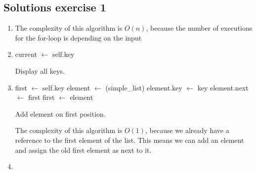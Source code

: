 \documentclass{article}
\begin{document}
\subsection*{Solutions exercise 1}
\begin{enumerate}
    \item The complexity of this algorithm is $O(n)$, because the number of executions for the for-loop is depending on the input
    \item
    \begin{algorithm}


     current $\leftarrow$ self.key \;


     \caption{Display all keys.}
\end{algorithm}
\vspace{-0.5cm}
    \item
    \begin{algorithm}


    first $\leftarrow$ self.key \;
    element $\leftarrow$ \New(simple\_list) \;
    element.key $\leftarrow$ key \;
    element.next $\leftarrow$ first \;
    first $\leftarrow$ element \;


     \caption{Add element on first position.}
\end{algorithm}
\vspace{-0.5cm}
    The complexity of this algorithm is $O(1)$, because we already have a reference to the first element of the list. This means we can add an element and assign the old first element as next to it.
    \item
    \begin{algorithm}


\end{algorithm}
\end{enumerate}
\end{document}
